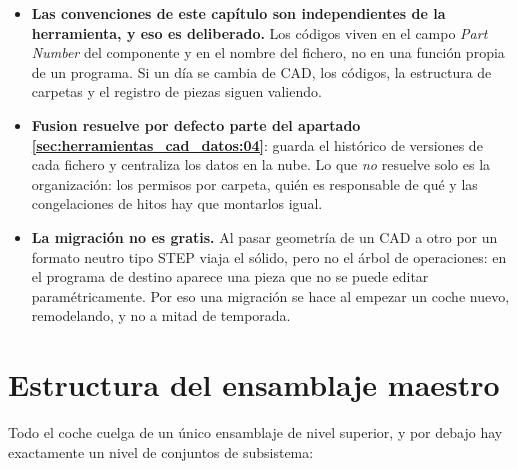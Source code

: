 \begin{itemize}
  \item \textbf{Las convenciones de este capítulo son independientes de la
        herramienta, y eso es deliberado.} Los códigos viven en el campo
        \emph{Part Number} del componente y en el nombre del fichero, no en una
        función propia de un programa. Si un día se cambia de CAD, los códigos, la
        estructura de carpetas y el registro de piezas siguen valiendo.
  \item \textbf{Fusion resuelve por defecto parte del apartado
        \ref{sec:herramientas_cad_datos:04}}: guarda el histórico de versiones de
        cada fichero y centraliza los datos en la nube. Lo que \emph{no} resuelve
        solo es la organización: los permisos por carpeta, quién es responsable de
        qué y las congelaciones de hitos hay que montarlos igual.
  \item \textbf{La migración no es gratis.} Al pasar geometría de un CAD a otro
        por un formato neutro tipo STEP viaja el sólido, pero no el árbol de
        operaciones: en el programa de destino aparece una pieza que no se puede
        editar paramétricamente. Por eso una migración se hace al empezar un coche
        nuevo, remodelando, y no a mitad de temporada.
\end{itemize}


\section{Estructura del ensamblaje maestro}
\label{sec:herramientas_cad_datos:01}

Todo el coche cuelga de un único ensamblaje de nivel superior, y por debajo hay
exactamente un nivel de conjuntos de subsistema:

